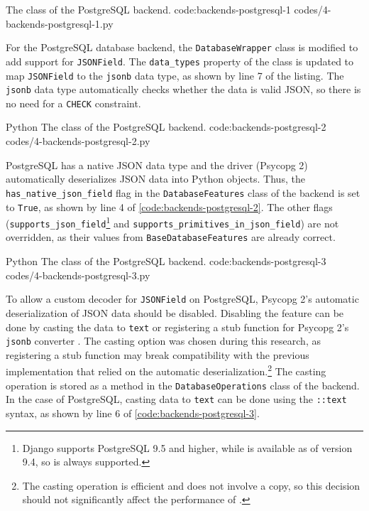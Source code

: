 {The  class of the PostgreSQL backend.}
{code:backends-postgresql-1}
{codes/4-backends-postgresql-1.py}

For the PostgreSQL database backend, the \verb|DatabaseWrapper| class is
modified to add support for \verb|JSONField|. The \verb|data_types| property of
the class is updated to map \verb|JSONField| to the \verb|jsonb| data type, as
shown by line 7 of the listing. The \verb|jsonb| data type automatically checks
whether the data is valid JSON, so there is no need for a \verb|CHECK|
constraint.

\listing
{Python}
{The  class of the PostgreSQL backend.}
{code:backends-postgresql-2}
{codes/4-backends-postgresql-2.py}

PostgreSQL has a native JSON data type and the driver (Psycopg 2) automatically
deserializes JSON data into Python objects. Thus, the
\verb|has_native_json_field| flag in the \verb|DatabaseFeatures| class of the
backend is set to \verb|True|, as shown by line 4 of
\autoref{code:backends-postgresql-2}. The other flags
(\verb|supports_json_field|\footnote{Django supports PostgreSQL 9.5 and higher,
while  is available as of version 9.4, so  is
always supported.} and \verb|supports_primitives_in_json_field|) are not
overridden, as their values from \verb|BaseDatabaseFeatures| are already
correct.

\listing
{Python}
{The  class of the PostgreSQL backend.}
{code:backends-postgresql-3}
{codes/4-backends-postgresql-3.py}

To allow a custom decoder for \verb|JSONField| on PostgreSQL, Psycopg 2's
automatic deserialization of JSON data should be disabled. Disabling the
feature can be done by casting the data to \verb|text| or registering a stub
function for Psycopg 2's \verb|jsonb| converter
\cite{psycopg2:json-adaptation}. The casting option was chosen during this
research, as registering a stub function may break compatibility with the
previous implementation that relied on the automatic
deserialization.\footnote{The casting operation is efficient and does not
involve a copy, so this decision should not significantly affect the
performance of  \cite{psycopg2:json-adaptation}.} The casting
operation is stored as a method in the \verb|DatabaseOperations| class of the
backend. In the case of PostgreSQL, casting data to \verb|text| can be done
using the \verb|::text| syntax, as shown by line 6 of
\autoref{code:backends-postgresql-3}.

